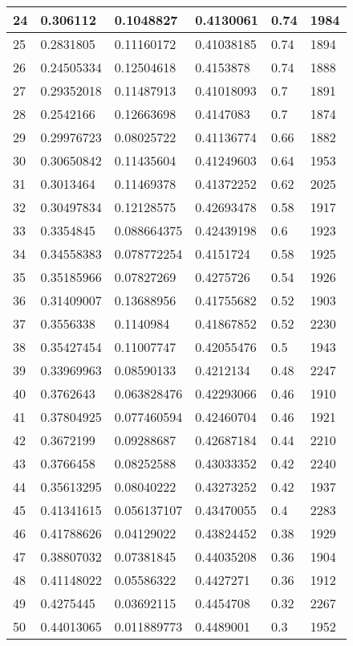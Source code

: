 \begin{longtable}{|l|l|l|l|l|l|}
24 & 0.306112 & 0.1048827 & 0.4130061 & 0.74 & 1984 \\ \hline 
25 & 0.2831805 & 0.11160172 & 0.41038185 & 0.74 & 1894 \\ \hline 
26 & 0.24505334 & 0.12504618 & 0.4153878 & 0.74 & 1888 \\ \hline 
27 & 0.29352018 & 0.11487913 & 0.41018093 & 0.7 & 1891 \\ \hline 
28 & 0.2542166 & 0.12663698 & 0.4147083 & 0.7 & 1874 \\ \hline 
29 & 0.29976723 & 0.08025722 & 0.41136774 & 0.66 & 1882 \\ \hline 
30 & 0.30650842 & 0.11435604 & 0.41249603 & 0.64 & 1953 \\ \hline 
31 & 0.3013464 & 0.11469378 & 0.41372252 & 0.62 & 2025 \\ \hline 
32 & 0.30497834 & 0.12128575 & 0.42693478 & 0.58 & 1917 \\ \hline 
33 & 0.3354845 & 0.088664375 & 0.42439198 & 0.6 & 1923 \\ \hline 
34 & 0.34558383 & 0.078772254 & 0.4151724 & 0.58 & 1925 \\ \hline 
35 & 0.35185966 & 0.07827269 & 0.4275726 & 0.54 & 1926 \\ \hline 
36 & 0.31409007 & 0.13688956 & 0.41755682 & 0.52 & 1903 \\ \hline 
37 & 0.3556338 & 0.1140984 & 0.41867852 & 0.52 & 2230 \\ \hline 
38 & 0.35427454 & 0.11007747 & 0.42055476 & 0.5 & 1943 \\ \hline 
39 & 0.33969963 & 0.08590133 & 0.4212134 & 0.48 & 2247 \\ \hline 
40 & 0.3762643 & 0.063828476 & 0.42293066 & 0.46 & 1910 \\ \hline 
41 & 0.37804925 & 0.077460594 & 0.42460704 & 0.46 & 1921 \\ \hline 
42 & 0.3672199 & 0.09288687 & 0.42687184 & 0.44 & 2210 \\ \hline 
43 & 0.3766458 & 0.08252588 & 0.43033352 & 0.42 & 2240 \\ \hline 
44 & 0.35613295 & 0.08040222 & 0.43273252 & 0.42 & 1937 \\ \hline 
45 & 0.41341615 & 0.056137107 & 0.43470055 & 0.4 & 2283 \\ \hline 
46 & 0.41788626 & 0.04129022 & 0.43824452 & 0.38 & 1929 \\ \hline 
47 & 0.38807032 & 0.07381845 & 0.44035208 & 0.36 & 1904 \\ \hline 
48 & 0.41148022 & 0.05586322 & 0.4427271 & 0.36 & 1912 \\ \hline 
49 & 0.4275445 & 0.03692115 & 0.4454708 & 0.32 & 2267 \\ \hline 
50 & 0.44013065 & 0.011889773 & 0.4489001 & 0.3 & 1952 \\ \hline 
\end{longtable}